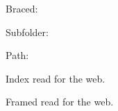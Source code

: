 \documentclass{article}
\begin{document}
Braced: \ownprimglossary\par
Subfolder: \ownprimindex\par
Path: \ownprimframed
\ifdefined\printindex\par Index read for the web.\fi
\ifdefined\MakeFramed\par Framed read for the web.\fi
\end{document}
